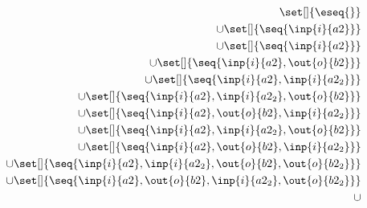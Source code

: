 \begin{align*}\set[]{\eseq{}} \\
\cup\set[]{\seq{\inp{i}{a2}}} \\
\cup\set[]{\seq{\inp{i}{a2}}} \\
\cup\set[]{\seq{\inp{i}{a2},\out{o}{b2}}} \\
\cup\set[]{\seq{\inp{i}{a2},\inp{i}{a2_2}}} \\
\cup\set[]{\seq{\inp{i}{a2},\inp{i}{a2_2},\out{o}{b2}}} \\
\cup\set[]{\seq{\inp{i}{a2},\out{o}{b2},\inp{i}{a2_2}}} \\
\cup\set[]{\seq{\inp{i}{a2},\inp{i}{a2_2},\out{o}{b2}}} \\
\cup\set[]{\seq{\inp{i}{a2},\out{o}{b2},\inp{i}{a2_2}}} \\
\cup\set[]{\seq{\inp{i}{a2},\inp{i}{a2_2},\out{o}{b2},\out{o}{b2_2}}} \\
\cup\set[]{\seq{\inp{i}{a2},\out{o}{b2},\inp{i}{a2_2},\out{o}{b2_2}}} \\
\cup\end{align*}
